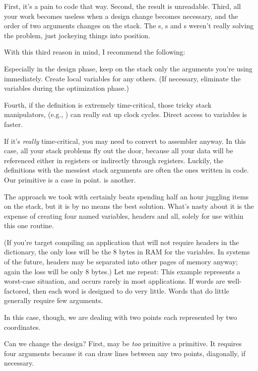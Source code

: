 First, it's a pain to code that way. Second, the result is unreadable.
Third, all your work becomes useless when a design change becomes
necessary, and the order of two arguments changes on the stack. The
s, s and s weren't really solving the problem,
just jockeying things into position.

With this third reason in mind, I recommend the following:

\begin{tip}
Especially in the design phase, keep on the stack only the arguments you're
using immediately. Create local variables for any others. (If necessary,
eliminate the variables during the optimization phase.)
\end{tip}
Fourth, if the definition is extremely time-critical, those tricky stack
manipulators, (e.g., ) can really eat up clock cycles. Direct
access to variables is faster.

If it's \emph{really} time-critical, you may need to convert to assembler
anyway. In this case, all your stack problems fly out the door, because all
your data will be referenced either in registers or indirectly through
registers. Luckily, the definitions with the messiest stack arguments are
often the ones written in code. Our \forth{[BOX]} primitive is a case in point.
 is another.

The approach we took with \forth{[BOX]} certainly beats spending half an
hour juggling items on the stack, but it is by no means the best solution.
What's nasty about it is the expense of creating four named variables,
headers and all, solely for use within this one routine.

(If you're target compiling an application that will not require
headers in the dictionary, the only loss will be the 8 bytes in RAM for the
variables. In \Forth{} systems of the future, headers may be separated
into other pages of memory anyway; again the loss will be only 8 bytes.)
Let me repeat: This example represents a worst-case situation, and
occurs rarely in most \Forth{} applications. If words are well-factored,
then each word is designed to do very little. Words that do little generally
require few arguments.

In this case, though, we are dealing with two points each represented
by two coordinates.

Can we change the design? First,  may be \emph{too} primitive a
primitive. It requires four arguments because it can draw lines between
any two points, diagonally, if necessary.

